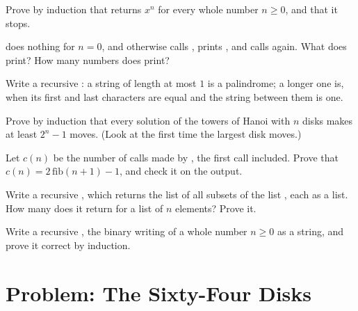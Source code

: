 \begin{exercise}[$\star\star$]\label{exo:g12:recursion:9}
Prove by induction that  returns $x^n$ for every whole number $n \ge 0$, and that it stops.
\end{exercise}

\begin{exercise}[$\star\star$]\label{exo:g12:recursion:10}
 does nothing for $n = 0$, and otherwise calls , prints , and calls
 again. What does  print? How many numbers does  print?
\end{exercise}

\begin{exercise}[$\star\star$]\label{exo:g12:recursion:11}
Write a recursive : a string of length at most $1$ is a palindrome; a longer one is, when its
first and last characters are equal and the string between them is one.
\end{exercise}

\begin{exercise}[$\star\star\star$]\label{exo:g12:recursion:12}
Prove by induction that every solution of the towers of Hanoi with $n$ disks makes at least $2^n - 1$ moves. (Look at
the first time the largest disk moves.)
\end{exercise}

\begin{exercise}[$\star\star\star$]\label{exo:g12:recursion:13}
Let $c(n)$ be the number of calls made by , the first call included. Prove that
$c(n) = 2\,\mathrm{fib}(n + 1) - 1$, and check it on the output.
\end{exercise}

\begin{exercise}[$\star\star\star$]\label{exo:g12:recursion:14}
Write a recursive , which returns the list of all subsets of the list , each as a list. How
many does it return for a list of $n$ elements? Prove it.
\end{exercise}

\begin{exercise}[$\star\star\star$]\label{exo:g12:recursion:15}
Write a recursive , the binary writing of a whole number $n \ge 0$ as a string, and prove it correct by
induction.
\end{exercise}

\section{Problem: The Sixty-Four Disks}\label{sec:g12:recursion:problem}

